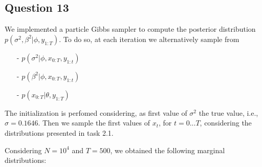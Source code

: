 \documentclass[]{article}
\begin{document}
\subsection*{Question 13}
We implemented a particle Gibbs sampler to compute the posterior distribution $p(\sigma^2, \beta^2|\phi, y_{1:T})$. To do so, at each iteration we alternatively sample from
\begin{enumerate}
	\item[-] $p(\sigma^2|\phi, x_{0:T}, y_{1:t})$
	\item[-] $p(\beta^2|\phi, x_{0:T}, y_{1:t})$
	\item[-] $p(x_{0:T}|\theta, y_{1:T})$
\end{enumerate}
The initialization is perfomed considering, as first value of $\sigma^2$ the true value, i.e., $\sigma = 0.1646$. Then we sample the first values of $x_t$, for $t=0...T$, considering the distributions presented in task 2.1.

Considering $N=10^4$ and $T=500$, we obtained the following marginal distributions:
\end{document}

